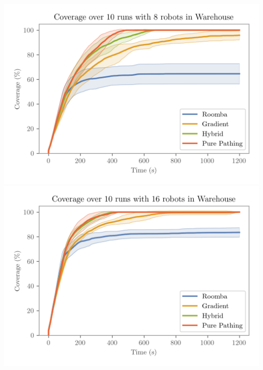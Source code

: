 \hfill
\includegraphics[width=\w]{figures/plots/benchmarks/coverage-over-10-runs-with-8-robots-in-warehouse.png}
\\
\includegraphics[width=\w]{figures/plots/benchmarks/coverage-over-10-runs-with-16-robots-in-warehouse.png}




\stopcontents[inner]
